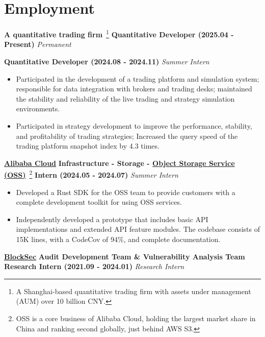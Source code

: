 \ifdefined\english

    \section*{Employment}

    \noindent \textbf{A quantitative trading firm}~\footnote{A Shanghai-based quantitative trading firm with assets under management (AUM) over 10 billion CNY.} \textbar{} \textbf{Quantitative Developer (2025.04 - Present)} \hfill \textsl{Permanent}

    \noindent {} \textbar{} \textbf{Quantitative Developer (2024.08 - 2024.11)} \hfill \textsl{Summer Intern}

    \begin{itemize}
        \item Participated in the development of a trading platform and simulation system; responsible for data integration with brokers and trading desks; maintained the stability and reliability of the live trading and strategy simulation environments.
        \item Participated in strategy development to improve the performance, stability, and profitability of trading strategies; Increased the query speed of the trading platform snapshot index by 4.3 times.
    \end{itemize}

    \noindent \textbf{\href{https://www.alibabacloud.com}{Alibaba Cloud}} \textbar{} \textbf{Infrastructure - Storage - \href{https://www.alibabacloud.com/en/product/object-storage-service}{Object Storage Service (OSS)}}~\footnote{OSS is a core business of Alibaba Cloud, holding the largest market share in China and ranking second globally, just behind AWS S3.} \textbar{} \textbf{Intern (2024.05 - 2024.07)} \hfill \textsl{Summer Intern}

    \begin{itemize}
        \item Developed a Rust SDK for the OSS team to provide customers with a complete development toolkit for using OSS services.
        \item Independently developed a prototype that includes basic API implementations and extended API feature modules. The codebase consists of 15K lines, with a CodeCov of 94\%, and complete documentation.
    \end{itemize}

    \noindent \textbf{\href{https://blocksec.com}{BlockSec}} \textbar{} \textbf{Audit Development Team \& Vulnerability Analysis Team} \textbar{} \textbf{Research Intern (2021.09 - 2024.01)} \hfill \textsl{Research Intern}

